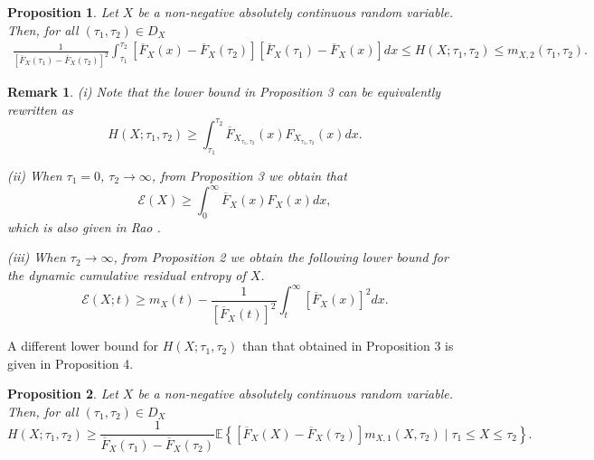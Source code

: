 \documentclass[11pt]{article}
\newtheorem{proposition}{Proposition}
\newtheorem{remark}{Remark}
\begin{document}
 
\begin{proposition}
	Let $X$ be a non-negative absolutely continuous random variable. Then, for all $(\tau_1,\tau_2)\in D_X$
	\begin{align*}
		\textstyle \frac{1}{[\overline{F}_X(\tau_1) - \overline{F}_X(\tau_2)]^2} \int_{\tau_1}^{\tau_2} [\overline{F}_X(x) - \overline{F}_X(\tau_2)][\overline{F}_X(\tau_1) - \overline{F}_X(x)] dx \leq H(X;\tau_1,\tau_2) \leq m_{X,2}(\tau_1,\tau_2).
	\end{align*}
\end{proposition}

 
\begin{remark}  
	(i) Note that the lower bound in Proposition 3 can be equivalently rewritten as
	$$ \textstyle H(X;\tau_1,\tau_2) \geq \int_{\tau_1}^{\tau_2} \overline{F}_{X_{\tau_1,\tau_2}}(x) F_{X_{\tau_1,\tau_2}}(x) dx. $$
	
	\noindent (ii) When $\tau_1=0$, $\tau_2 \to \infty$, from Proposition 3 we obtain that
	$$ \textstyle \mathcal{E}(X) \geq \int_0^\infty \overline{F}_X(x) F_X(x) dx, $$
	which is also given in Rao \cite[rel. (5)]{Rao2005}.
	
	\noindent (iii) When $\tau_2 \to \infty$, from Proposition 2 we obtain the following lower bound for the dynamic cumulative residual entropy of $X$.
	$$ \textstyle \mathcal{E}(X;t) \geq m_X(t) - \frac{1}{[\overline{F}_X(t)]^2} \int_t^\infty [\overline{F}_X(x)]^2 dx. $$
\end{remark}

A different lower bound for $H(X;\tau_1,\tau_2)$ than that obtained in Proposition 3 is given in Proposition 4.

 
\begin{proposition}
	Let $X$ be a non-negative absolutely continuous random variable. Then, for all $(\tau_1,\tau_2)\in D_X$
	$$ \textstyle H(X;\tau_1,\tau_2) \geq \frac{1}{\overline{F}_X(\tau_1) - \overline{F}_X(\tau_2)} \mathbb{E}\left\{ [\overline{F}_X(X) - \overline{F}_X(\tau_2)] m_{X,1}(X,\tau_2) \mid \tau_1 \leq X \leq \tau_2 \right\}. $$
\end{proposition}
\end{document}
